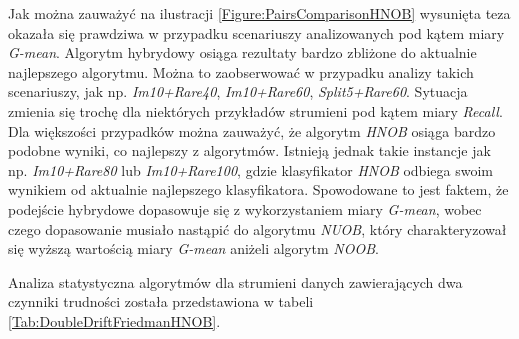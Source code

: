 \noindent Jak można zauważyć na ilustracji \ref{Figure:PairsComparisonHNOB} wysunięta teza okazała się prawdziwa w przypadku scenariuszy analizowanych pod kątem miary \textit{G-mean}. Algorytm hybrydowy osiąga rezultaty bardzo zbliżone do aktualnie najlepszego algorytmu. Można to zaobserwować w przypadku analizy takich scenariuszy, jak np. \textit{Im10+Rare40}, \textit{Im10+Rare60}, \textit{Split5+Rare60}. Sytuacja zmienia się trochę dla niektórych przykładów strumieni pod kątem miary \textit{Recall}. Dla większości przypadków można zauważyć, że algorytm \textit{HNOB} osiąga bardzo podobne wyniki, co najlepszy z algorytmów. Istnieją jednak takie instancje jak np. \textit{Im10+Rare80} lub \textit{Im10+Rare100}, gdzie klasyfikator \textit{HNOB} odbiega swoim wynikiem od aktualnie najlepszego klasyfikatora. Spowodowane to jest faktem, że podejście hybrydowe dopasowuje się z wykorzystaniem miary \textit{G-mean}, wobec czego dopasowanie musiało nastąpić do algorytmu \textit{NUOB}, który charakteryzował się wyższą wartością miary \textit{G-mean} aniżeli algorytm \textit{NOOB}.

Analiza statystyczna algorytmów dla strumieni danych zawierających dwa czynniki trudności została przedstawiona w tabeli \ref{Tab:DoubleDriftFriedmanHNOB}.

\newpage

